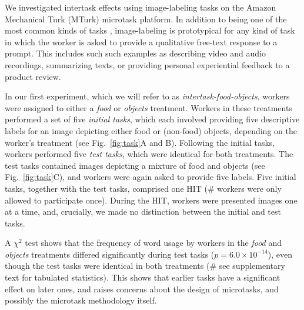 \documentclass[12pt]{article}
\begin{document}
We investigated intertask effects using image-labeling tasks on the Amazon 
Mechanical Turk (MTurk) microtask platform.  
In addition to being one of the most common kinds of tasks
\cite{chandler2013breaking,Berinsky2012351,Finnerty2013,paolacci2010running},
image-labeling is prototypical for any kind of task in which the worker is 
asked to provide a qualitative free-text response to a prompt.  
This includes such such examples as describing
video and audio recordings, summarizing texts, or providing personal 
experiential feedback to a product review.

In our first experiment, which we will refer to as 
\textit{intertask-food-objects}, workers were assigned to either a
\textit{food} or \textit{objects} treatment.  Workers in these treatments
performed a set of five \textit{initial tasks}, which each involved 
providing five descriptive labels for an image depicting 
either food or (non-food) objects, depending on the worker's 
treatment (see Fig.~\ref{fig:task}A and B).  Following the initial 
tasks, workers performed five \textit{test tasks}, which were identical for 
both treatments.  The test tasks contained images depicting a 
mixture of food and objects (see Fig.~\ref{fig:task}C), and workers
were again asked to provide five labels.  Five initial 
tasks, together with the test tasks, comprised one HIT 
(\# workers were only allowed to participate once). During the HIT, workers 
were presented images one at a time, and, crucially, we made no 
distinction between the initial and test tasks.

A $\chi^2$ test shows that the frequency of word usage by
workers in the \textit{food} and \textit{objects} treatments differed
significantly during test tasks ($p = 6.0 \times 10^{-14}$), even though the test tasks were identical 
in both treatments (\# see supplementary text for tabulated statistics).  This shows that earlier tasks have a 
significant effect on later ones, and raises concerns about the 
design of microtasks, and possibly the microtask methodology itself.
\end{document}
